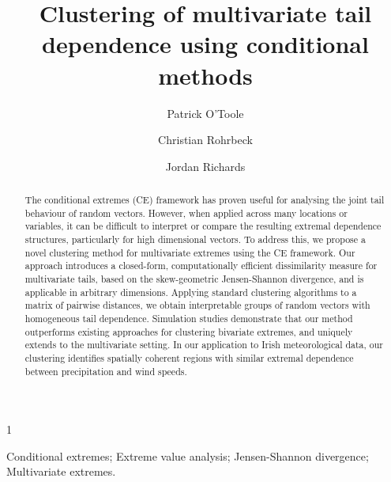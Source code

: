 \documentclass[preprint,12pt,authoryear]{elsarticle}
\newcommand{\blind}{1}
\begin{document}
\def\spacingset#1{\renewcommand{\baselinestretch}%
{#1}\small\normalsize} \spacingset{1}


\begin{frontmatter}

\title{\bf Clustering of multivariate tail dependence using conditional methods}

\blind
  \author{Patrick O'Toole}
  \address{Department of Mathematical Sciences, University of Bath, UK}
  \author{Christian Rohrbeck}
  \address{Department of Mathematical Sciences, University of Bath, UK}
  \author{Jordan Richards}
  \address{School of Mathematics and Maxwell Institute for Mathematical Sciences, University of Edinburgh, UK}
\else 
  \author{}
  \address{}
\fi

\begin{abstract}
  The conditional extremes (CE) framework has proven useful for analysing the joint tail behaviour of random vectors.
  However, when applied across many locations or variables, it can be difficult to interpret or compare the resulting extremal dependence structures, particularly for high dimensional vectors. 
  To address this, we propose a novel clustering method for multivariate extremes using the CE framework.
  Our approach introduces a closed-form, computationally efficient dissimilarity measure for multivariate tails, based on the skew-geometric Jensen-Shannon divergence, and is applicable in arbitrary dimensions.
  Applying standard clustering algorithms to a matrix of pairwise distances, we obtain interpretable groups of random vectors with homogeneous tail dependence.
  Simulation studies demonstrate that our method outperforms existing approaches for clustering bivariate extremes, and uniquely extends to the multivariate setting. 
  In our application to Irish meteorological data, our clustering identifies spatially coherent regions with similar extremal dependence between precipitation and wind speeds. 
\end{abstract}

\begin{keyword}
Conditional extremes; Extreme value analysis; Jensen-Shannon divergence; Multivariate extremes.
\end{keyword}

\end{frontmatter}

\newpage
\spacingset{1.75} %
\end{document}
